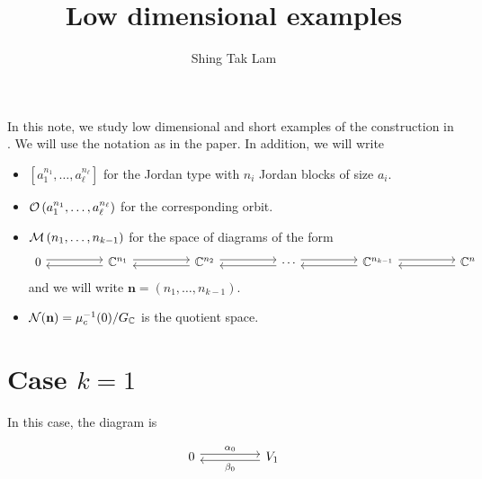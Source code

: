 \documentclass{article}
\title{Low dimensional examples}
\author{Shing Tak Lam}
\begin{document}
\maketitle

In this note, we study low dimensional and short examples of the construction in \cite{kobak_classical_1996}. We will use the notation as in the paper. In addition, we will write

\begin{itemize}
	\item \([a_1^{n_1}, \dots, a_{\ell}^{n_\ell}]\) for the Jordan type with \(n_i\) Jordan blocks of size \(a_i\).
	\item \(\mathcal{O}\left(a_1^{n_1}, \dots, a_\ell^{n_\ell}\right)\) for the corresponding orbit.
	\item \(\mathcal{M}\left(n_1, \dots, n_{k-1}\right)\) for the space of diagrams of the form
	\[\begin{tikzcd}
		0 && {\C^{n_1}} && {\C^{n_2}} && \cdots && {\C^{n_{k-1}}} && {\C^n}
		\arrow[shift left=1, from=1-3, to=1-5]
		\arrow[shift left=1, from=1-5, to=1-7]
		\arrow[shift left=1, from=1-7, to=1-9]
		\arrow[shift left=1, from=1-9, to=1-11]
		\arrow[shift left=1, from=1-11, to=1-9]
		\arrow[shift left=1, from=1-9, to=1-7]
		\arrow[shift left=1, from=1-7, to=1-5]
		\arrow[shift left=1, from=1-5, to=1-3]
		\arrow[shift left=1, from=1-3, to=1-1]
		\arrow[shift left=1, from=1-1, to=1-3]
	\end{tikzcd}\]
	and we will write \(\mathbf n = (n_1, \dots, n_{k-1})\).
	\item \(\mathcal{N}(\mathbf n) = \mu_c^{-1}(0)/G_{\mathbb{C}}\) is the quotient space.
\end{itemize}

\section*{Case \(k=1\)}

In this case, the diagram is

\[\begin{tikzcd}
	0 && {V_1}
	\arrow["{\alpha_0}", shift left=1, from=1-1, to=1-3]
	\arrow["{\beta_0}", shift left=1, from=1-3, to=1-1]
\end{tikzcd}\]
\end{document}
